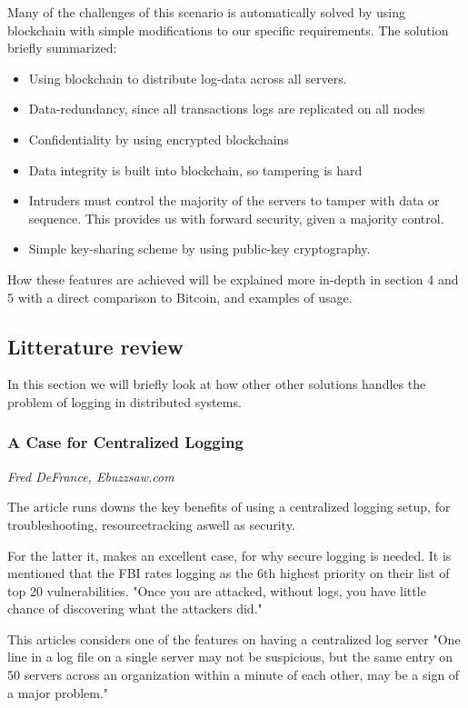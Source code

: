 Many of the challenges of this scenario is automatically solved by using blockchain with simple modifications to our specific requirements.
The solution briefly summarized:
\begin{itemize}
    \item Using blockchain to distribute log-data across all servers.
    \item Data-redundancy, since all transactions logs are replicated on all nodes
    \item Confidentiality by using encrypted blockchains
    \item Data integrity is built into blockchain, so tampering is hard
    \item Intruders must control the majority of the servers to tamper with data or sequence. This provides us with forward security, given a majority control.
    \item Simple key-sharing scheme by using public-key cryptography.
\end{itemize}

How these features are achieved will be explained more in-depth in section 4 and 5 with a direct comparison to Bitcoin, and examples of usage.

\subsection{Litterature review}
In this section we will briefly look at how other other solutions handles the problem of logging in distributed systems. 
\subsubsection{A Case for Centralized Logging }
\vspace{-3mm}
{\footnotesize \it Fred DeFrance, Ebuzzsaw.com}~\cite{defrance}

The article runs downs the key benefits of using a centralized logging
setup, for troubleshooting, resourcetracking aswell as security.

For the latter it, makes an excellent case, for why secure logging is
needed. It is mentioned that the FBI rates logging as the 6th highest
priority on their list of top 20 vulnerabilities. "Once you are
attacked, without logs, you have little chance of discovering what the
attackers did."~\cite{defrance}

This articles considers one of the features on having a centralized
log server "One line in a log file on a single server may not be
suspicious, but the same entry on 50 servers across an organization
within a minute of each other, may be a sign of a major
problem."~\cite{defrance}


